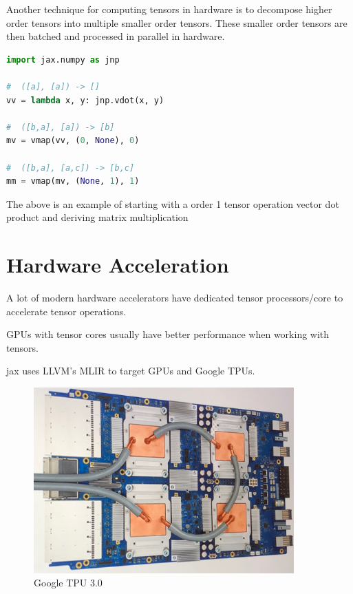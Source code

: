 \documentclass[statementpaper,oneside,article,14pt]{memoir}
\begin{document}
\vfill

Another technique for computing tensors in hardware is to decompose higher order tensors into multiple smaller order tensors. These smaller order tensors are then batched and processed in parallel in hardware.

\vfill

\begin{lstlisting}[language=Python]
import jax.numpy as jnp

#  ([a], [a]) -> []
vv = lambda x, y: jnp.vdot(x, y) 

#  ([b,a], [a]) -> [b]
mv = vmap(vv, (0, None), 0)

#  ([b,a], [a,c]) -> [b,c]
mm = vmap(mv, (None, 1), 1)
\end{lstlisting}

\vfill

The above is an example of starting with a order 1 tensor operation vector dot product and deriving matrix multiplication

\vfill

\newpage
\section{Hardware Acceleration}

\vfill

A lot of modern hardware accelerators have dedicated tensor processors/core to accelerate tensor operations.

GPUs with tensor cores usually have better performance when working with tensors.

jax uses LLVM's MLIR to target GPUs and Google TPUs.

\vfill

\begin{figure}[htp]
  \centering
  \includegraphics[width=10cm]{TPU}
  \caption{Google TPU 3.0}
  \label{fig:tpu}
\end{figure}
\end{document}
